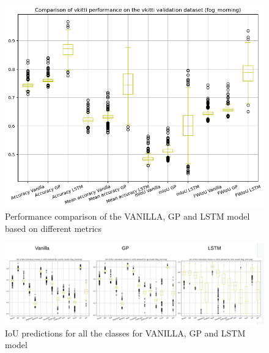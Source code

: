 	\begin{figure}
		\centering
		\includegraphics[width=12cm]{images/vkitti_validation_data_two_class_box_plot.png}
		\caption{Performance comparison of the VANILLA, GP and LSTM model based on different metrics}
		\label{fig:performance_metric_vkitti_two_class_box_plot}
	\end{figure}
	
	\begin{figure}
		\centering
		\includegraphics[width=19cm]{images/IoU_two.png}
		\caption{IoU predictions for all the classes for VANILLA, GP and LSTM model}
		\label{fig:performance_metric_three_classes}
	\end{figure}

